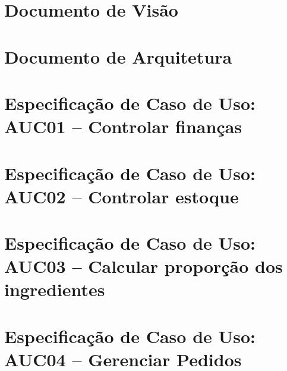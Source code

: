 \begin{anexosenv}
\partanexos
\chapter{Documento de Visão} \label{doc:visao}


\chapter{Documento de Arquitetura} \label{doc:arq}


\chapter{Especificação de Caso de Uso: AUC01 -- Controlar finanças} \label{doc:auc01}


\chapter{Especificação de Caso de Uso: AUC02 -- Controlar estoque} \label{doc:auc02}


\chapter{Especificação de Caso de Uso: AUC03 -- Calcular proporção dos ingredientes} \label{doc:auc03}


\chapter{Especificação de Caso de Uso: AUC04 -- Gerenciar Pedidos} \label{doc:auc04}


\end{anexosenv}
